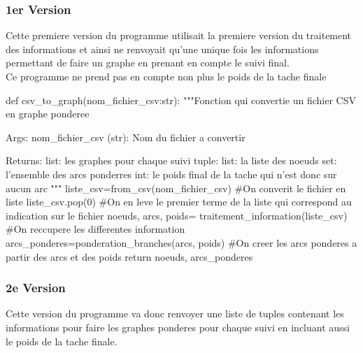 \documentclass{article}
\begin{document}
\subsubsection{1er Version}
Cette premiere version du programme utilisait la premiere version du traitement des informations et ainsi ne renvoyait qu'une unique fois les informations permettant de faire un graphe en prenant en compte le suivi final.
\\
Ce programme ne prend pas en compte non plus le poids de la tache finale
\begin{python}
def csv_to_graph(nom_fichier_csv:str):
    """Fonction qui convertie un fichier CSV en graphe ponderee

    Args:
        nom_fichier_csv (str): Nom du fichier a convertir

    Returns:
        list: les graphes pour chaque suivi
            tuple:
                list: la liste des noeuds
                set: l'ensemble des arcs ponderres
                int: le poids final de la tache qui n'est donc sur aucun arc
    """
    liste_csv=from_csv(nom_fichier_csv) #On converit le fichier en liste
    liste_csv.pop(0) #On en leve le premier terme de la liste qui correspond au indication sur le fichier
    noeuds, arcs, poids= traitement_information(liste_csv) #On reccupere les differentes information
    arcs_ponderes=ponderation_branches(arcs, poids) #On creer les arcs ponderes a partir des arcs et des poids
    return noeuds, arcs_ponderes
\end{python}

\subsubsection{2e Version}

Cette version du programme va donc renvoyer une liste de tuples contenant les informations pour faire les graphes ponderes pour chaque suivi en incluant aussi le poids de la tache finale.
\end{document}
